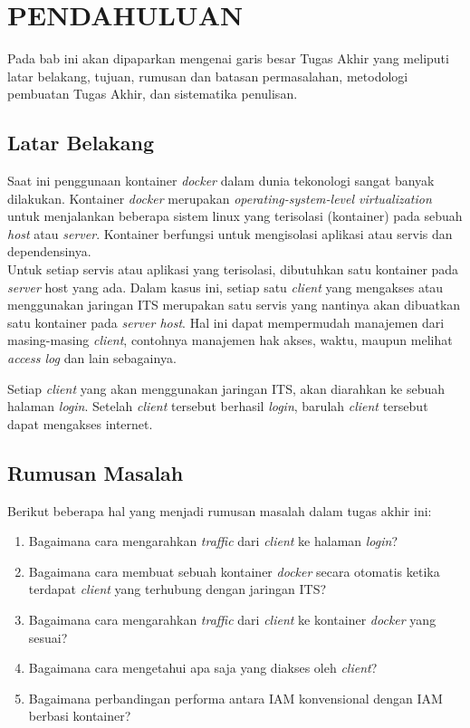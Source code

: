 \chapter{PENDAHULUAN}
  Pada bab ini akan dipaparkan mengenai garis besar Tugas Akhir yang meliputi latar belakang, tujuan, rumusan dan batasan permasalahan, metodologi pembuatan Tugas Akhir, dan sistematika penulisan.
  
  \section{Latar Belakang}
    Saat ini penggunaan kontainer \textit{docker} dalam dunia tekonologi sangat banyak dilakukan. Kontainer \textit{docker} merupakan \textit{operating-system-level virtualization} untuk menjalankan beberapa sistem linux yang terisolasi (kontainer) pada sebuah \textit{host} atau \textit{server}. Kontainer berfungsi untuk mengisolasi aplikasi atau servis dan dependensinya.\\
	\indent Untuk setiap servis atau aplikasi yang terisolasi, dibutuhkan satu kontainer pada \textit{server} host yang ada. Dalam kasus ini, setiap satu \textit{client} yang mengakses atau menggunakan jaringan ITS merupakan satu servis yang nantinya akan dibuatkan satu kontainer pada \textit{server host}. Hal ini dapat mempermudah manajemen dari masing-masing \textit{client}, contohnya manajemen hak akses, waktu, maupun melihat \textit{access log} dan lain sebagainya.
	
	Setiap \textit{client} yang akan menggunakan jaringan ITS, akan diarahkan ke sebuah halaman \textit{login}. Setelah \textit{client} tersebut berhasil \textit{login}, barulah \textit{client} tersebut dapat mengakses internet.

\section{Rumusan Masalah}
	Berikut beberapa hal yang menjadi rumusan masalah dalam tugas akhir ini:
	\begin{enumerate}
	 \item Bagaimana cara mengarahkan \textit{traffic} dari \textit{client} ke halaman \textit{login}?
	 \item Bagaimana cara membuat sebuah kontainer \textit{docker} secara otomatis ketika terdapat \textit{client} yang terhubung dengan jaringan ITS?
	 \item Bagaimana cara mengarahkan \textit{traffic} dari \textit{client} ke kontainer \textit{docker} yang sesuai?
	 \item Bagaimana cara mengetahui apa saja yang diakses oleh \textit{client}?
	 \item Bagaimana perbandingan performa antara IAM konvensional dengan IAM berbasi kontainer?
	\end{enumerate}


